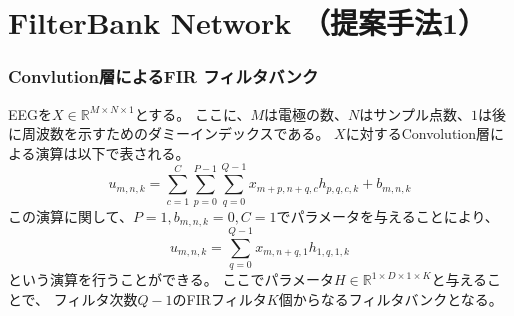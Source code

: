 


\section{\rm FilterBank Network \mc（提案手法1）}
\subsubsection{\rm Convlution\mc 層によるFIR フィルタバンク}
EEGを\(X\in \mathbb R^{M\times N\times 1}\)とする。
ここに、\(M\)は電極の数、\(N\)はサンプル点数、\(1\)は後に周波数を示すためのダミーインデックスである。
\(X\)に対するConvolution層による演算は以下で表される。
\begin{equation}
    u_{m,n,k} = \sum_{c=1}^C\sum_{p=0}^{P-1}\sum_{q=0}^{Q-1} x_{m+p,n+q,c} h_{p,q,c,k} + b_{m,n,k}
\end{equation} 
この演算に関して、\(P=1,b_{m,n,k}=0,C=1\)でパラメータを与えることにより、
\begin{equation}
    u_{m,n,k} = \sum_{q=0}^{Q-1} x_{m,n+q,1} h_{1,q,1,k}
    \label{eq:pseudoFIR}
\end{equation} 
という演算を行うことができる。
ここでパラメータ\(H\in \mathbb R^{1\times D\times 1\times K}\)と与えることで、
フィルタ次数\(Q-1\)のFIRフィルタ\(K\)個からなるフィルタバンクとなる。

